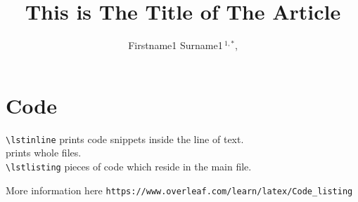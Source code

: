 \documentclass[utf8]{my_class_1_front_vanc}  %
\def\Authors{
        Firstname1 Surname1\,$^{1,*}$,
        }
\def\firstAuthorLast{Firstname1 {et~al.}} %
\begin{document}

\onecolumn
{}

\title[This Is The Running Title]{This is The Title of The Article} 

\author[\firstAuthorLast ]{\Authors} 
\address{} 
\correspondence{} 

\extraAuth{}%


\maketitle


\section{Code}\label{code}

\verb:\lstinline: prints code snippets inside the line of text.\\
\verb:: prints whole files.\\
\verb:\lstlisting: pieces of code which reside in the main file.

\noindent More information here \verb-https://www.overleaf.com/learn/latex/Code_listing-


\end{document}
